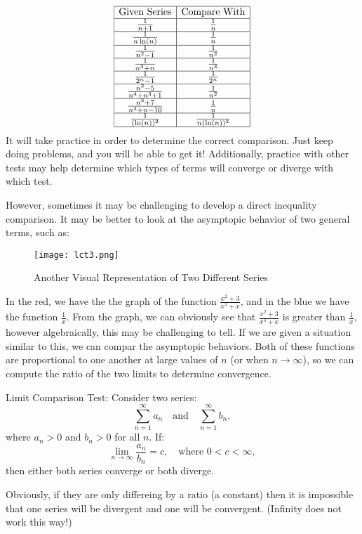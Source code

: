 \documentclass[a4paper, 11pt]{article}
\newenvironment{concept}{%
    \vspace{1em}
    \begin{tcolorbox}[colframe=black!70, colback=white!95, title=Definition]
}{%
    \end{tcolorbox}
    \vspace{1em}
}
\begin{document}
\[
\begin{array}{|c|c|}
\hline
\text{Given Series} & \text{Compare With} \\ \hline
\frac{1}{n+1} & \frac{1}{n} \\ \hline
\frac{1}{n\ln(n)} & \frac{1}{n} \\ \hline
\frac{1}{n^2-1} & \frac{1}{n^2} \\ \hline
\frac{1}{n^3+n} & \frac{1}{n^3} \\ \hline
\frac{1}{2^n-1} & \frac{1}{2^n} \\ \hline
\frac{n^2-5}{n^4+n^3+1} & \frac{1}{n^2} \\ \hline
\frac{n^3+7}{n^4+n-10} & \frac{1}{n} \\ \hline
\frac{1}{(\ln(n))^2} & \frac{1}{n(\ln(n))^2} \\ \hline
\end{array}
\]
It will take practice in order to determine the correct comparison. Just keep doing problems, and you will be able to get it! Additionally, practice with other tests may help determine which types of terms will converge or diverge with which test. 
\par 
However, sometimes it may be challenging to develop a direct inequality comparison. It may be better to look at the asymptopic behavior of two general terms, such as:
\begin{figure}[h]
    \caption{Another Visual Representation of Two Different Series}
    \centering
    \texttt{[image: lct3.png]}
\end{figure}
In the red, we have the the graph of the function $\frac{x^2+3}{x^3+x}$, and in the blue we have the function $\frac{1}{x}$. From the graph, we can obviously see that $\frac{x^2+3}{x^3+x}$ is greater than $\frac{1}{x}$, however algebraically, this may be challenging to tell. If we are given a situation similar to this, we can compar the asymptopic behaviors. Both of these functions are proportional to one another at large values of $n$ (or when $n \rightarrow \infty$), so we can compute the ratio of the two limits to determine convergence. 
\begin{concept}{Limit Comparison Test:}
    Consider two series:\[\sum_{n=1}^\infty a_n \quad \text{and} \quad \sum_{n=1}^\infty b_n,\]
    where \( a_n > 0 \) and \( b_n > 0 \) for all \( n \).
    If:\[\lim_{n \to \infty} \frac{a_n}{b_n} = c, \quad \text{where } 0 < c < \infty,\]
    then either both series converge or both diverge.
    \end{concept}
Obviously, if they are only differeing by a ratio (a constant) then it is impossible that one series will be divergent and one will be convergent. (Infinity does not work this way!)
\end{document}
